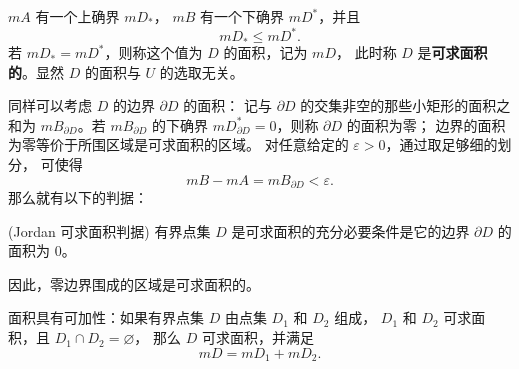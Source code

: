 \begin{definition}
	$mA$ 有一个上确界 $mD_*$，
$mB$ 有一个下确界 $mD^*$，并且
\[
mD_*\le mD^*.
\]
若 $mD_*=mD^*$，则称这个值为 $D$ 的面积，记为 $mD$，
此时称 $D$ 是\textbf{可求面积的}。显然 $D$ 的面积与 $U$ 的选取无关。
\end{definition}

同样可以考虑 $D$ 的边界 $\partial D$ 的面积：
记与 $\partial D$ 的交集非空的那些小矩形的面积之和为
$mB_{\partial D}$。若 $mB_{\partial D}$ 的下确界
$mD^*_{\partial D}=0$，则称 $\partial D$ 的面积为零；
边界的面积为零等价于所围区域是可求面积的区域。
对任意给定的 $\varepsilon>0$，通过取足够细的划分，
可使得
\[
mB-mA=mB_{\partial D}<\varepsilon.
\]
那么就有以下的判据：
\begin{proposition}(Jordan 可求面积判据)
有界点集 $D$ 是可求面积的充分必要条件是它的边界
$\partial D$ 的面积为 $0$。
\end{proposition}

因此，零边界围成的区域是可求面积的。

面积具有可加性：如果有界点集 $D$ 由点集 $D_1$ 和 $D_2$ 组成，
$D_1$ 和 $D_2$ 可求面积，且 $D_1\cap D_2=\varnothing$，
那么 $D$ 可求面积，并满足
\[
mD=mD_1+mD_2.
\]

